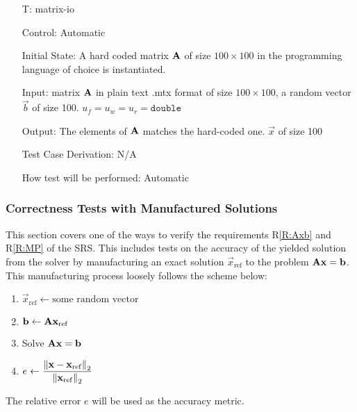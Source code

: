 \documentclass[12pt, titlepage]{article}
\newcounter{testnum} %
\newcommand{\rref}[1]{R\ref{#1}}
\begin{document}
\begin{itemize}

\item[T\refstepcounter{testnum}\thetestnum \label{T:io}:]{matrix-io}

Control: Automatic

Initial State: A hard coded matrix \(\mathbf{A}\) of size \(\num{100} \times
\num{100}\) in the programming language of choice is instantiated.

Input: matrix \(\mathbf{A}\) in plain text .mtx format of size \(\num{100} \times
\num{100}\), a random vector \(\vec{b}\) of size \num{100}. \(u_f = u_w = u_r =
\texttt{double}\)

Output: The elements of \(\mathbf{A}\) matches the hard-coded one. \(\vec{x}\) of size
\num{100}

Test Case Derivation: N/A

How test will be performed: Automatic

\end{itemize}

\subsubsection{Correctness Tests with Manufactured Solutions}

This section covers one of the ways to verify the requirements \rref{R:Axb} and
\rref{R:MP} of the SRS. This includes tests on the accuracy of the yielded
solution from the solver by manufacturing an exact solution \(\vec{x}_\mathrm{ref}\) to the
problem \(\mathbf{A}\mathbf{x} = \mathbf{b}\). This manufacturing process loosely follows the scheme
below:

\begin{enumerate}
\item \(\vec{x}_\mathrm{ref} \gets \text{some random vector}\)
\item \(\mathbf{b} \gets \mathbf{A} \mathbf{x}_\mathrm{ref} \)
\item Solve \(\mathbf{A}\mathbf{x} = \mathbf{b}\)
\item \(e \gets \displaystyle \frac{\left\lVert\mathbf{x} - \mathbf{x}_\mathrm{ref}\right\rVert_2}{\left\lVert\mathbf{x}_\mathrm{ref}\right\rVert_2}\)
\end{enumerate}

The relative error \(e\) will be used as the accuracy metric.
\end{document}

